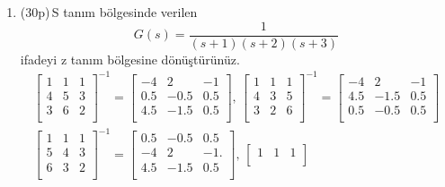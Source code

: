 \begin{enumerate}[\bfseries S1.]
    \item (30p)\,S tanım bölgesinde verilen 
    \begin{equation}
        G(s)=\frac{1}{(s+1)(s+2)(s+3)}
    \end{equation}
    ifadeyi z tanım bölgesine dönüştürünüz. 
    \begin{equation*}
    \begin{split}
        \begin{bmatrix}
            1&     1&     1\\
            4&     5&     3\\
            3&     6&     2\\
        \end{bmatrix}^{-1}=\begin{bmatrix}
            -4 &   2   &    -1\\
            0.5&   -0.5&    0.5\\
            4.5&   -1.5&    0.5\\
        \end{bmatrix},\,
        \begin{bmatrix}
            1&     1&     1\\
            4&     3&     5\\
            3&     2&     6\\
        \end{bmatrix}^{-1}=\begin{bmatrix}
            -4&    2&   -1\\
            4.5&   -1.5&    0.5\\
            0.5&  -0.5&    0.5\\
        \end{bmatrix}\\
        \begin{bmatrix}
            1&     1&     1\\
            5&     4&     3\\
            6&     3&     2\\
        \end{bmatrix}^{-1}=\begin{bmatrix}
        0.5 &  -0.5 &   0.5\\
        -4&    2&   -1.\\
        4.5 &  -1.5 &   0.5\\
        \end{bmatrix},\,
        \begin{bmatrix}
            1&     1&     1\\

\end{bmatrix}
\end{split}
\end{equation*}
\end{enumerate}
